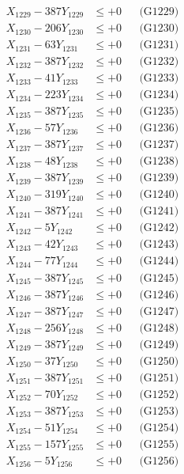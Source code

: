 \documentclass[a4paper,10pt]{article}
\begin{document}
{\begin{align}
X_{1229} - 387Y_{1229} &\leq +0 && \text{(G1229)} \\
X_{1230} - 206Y_{1230} &\leq +0 && \text{(G1230)} \\
\allowbreak
X_{1231} - 63Y_{1231} &\leq +0 && \text{(G1231)} \\
X_{1232} - 387Y_{1232} &\leq +0 && \text{(G1232)} \\
X_{1233} - 41Y_{1233} &\leq +0 && \text{(G1233)} \\
X_{1234} - 223Y_{1234} &\leq +0 && \text{(G1234)} \\
X_{1235} - 387Y_{1235} &\leq +0 && \text{(G1235)} \\
X_{1236} - 57Y_{1236} &\leq +0 && \text{(G1236)} \\
X_{1237} - 387Y_{1237} &\leq +0 && \text{(G1237)} \\
X_{1238} - 48Y_{1238} &\leq +0 && \text{(G1238)} \\
X_{1239} - 387Y_{1239} &\leq +0 && \text{(G1239)} \\
X_{1240} - 319Y_{1240} &\leq +0 && \text{(G1240)} \\
\allowbreak
X_{1241} - 387Y_{1241} &\leq +0 && \text{(G1241)} \\
X_{1242} - 5Y_{1242} &\leq +0 && \text{(G1242)} \\
X_{1243} - 42Y_{1243} &\leq +0 && \text{(G1243)} \\
X_{1244} - 77Y_{1244} &\leq +0 && \text{(G1244)} \\
X_{1245} - 387Y_{1245} &\leq +0 && \text{(G1245)} \\
X_{1246} - 387Y_{1246} &\leq +0 && \text{(G1246)} \\
X_{1247} - 387Y_{1247} &\leq +0 && \text{(G1247)} \\
X_{1248} - 256Y_{1248} &\leq +0 && \text{(G1248)} \\
X_{1249} - 387Y_{1249} &\leq +0 && \text{(G1249)} \\
X_{1250} - 37Y_{1250} &\leq +0 && \text{(G1250)} \\
\allowbreak
X_{1251} - 387Y_{1251} &\leq +0 && \text{(G1251)} \\
X_{1252} - 70Y_{1252} &\leq +0 && \text{(G1252)} \\
X_{1253} - 387Y_{1253} &\leq +0 && \text{(G1253)} \\
X_{1254} - 51Y_{1254} &\leq +0 && \text{(G1254)} \\
X_{1255} - 157Y_{1255} &\leq +0 && \text{(G1255)} \\
X_{1256} - 5Y_{1256} &\leq +0 && \text{(G1256)} \\

\end{align}}
\end{document}
